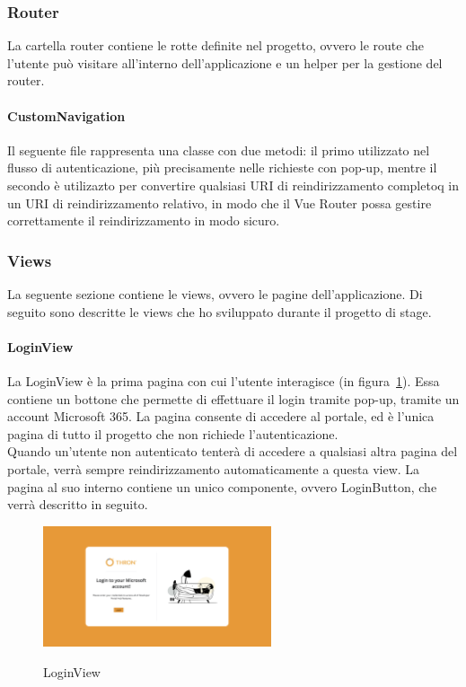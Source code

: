 \subsubsection{Router}\label{subsubsec:router}
La cartella router contiene le rotte definite nel progetto, ovvero le route che l'utente può visitare all'interno dell'applicazione e un helper per la gestione del router.
\paragraph{CustomNavigation}\label{par:custom-navigation}
Il seguente file rappresenta una classe con due metodi: il primo utilizzato nel flusso di autenticazione, più precisamente nelle richieste con pop-up,
mentre il secondo è utilizazto per convertire qualsiasi URI di reindirizzamento completoq in un URI di reindirizzamento relativo, in modo che il Vue Router
possa gestire correttamente il reindirizzamento in modo sicuro.


\subsubsection{Views}\label{subsubsec:views}
La seguente sezione contiene le views, ovvero le pagine dell'applicazione.
Di seguito sono descritte le views che ho sviluppato durante il progetto di stage.

\paragraph{LoginView}\label{par:login-view}
La LoginView è la prima pagina con cui l'utente interagisce (in figura~\ref{fig:login-view}). Essa contiene un bottone che permette di effettuare il login tramite pop-up, tramite un account Microsoft 365.
La pagina consente di accedere al portale, ed è l'unica pagina di tutto il progetto che non richiede l'autenticazione.\\
Quando un'utente non autenticato tenterà di accedere a qualsiasi altra pagina del portale, verrà sempre reindirizzamento
automaticamente a questa view. La pagina al suo interno contiene un unico componente, ovvero LoginButton, che verrà descritto in seguito.
\begin{figure}[ht]
  \centering
  \includegraphics[width=0.6\textwidth, alt={Pagina di login dell'applicazione}]{images/frontend/LoginView.jpg}
  \caption{LoginView}\label{fig:login-view}
\end{figure}
\pagebreak


